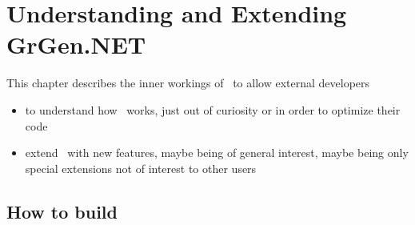 \chapter{Understanding and Extending GrGen.NET} \label{cha:developing}

This chapter describes the inner workings of \GrG~to allow external developers
\begin{itemize}
\item to understand how \GrG~works, just out of curiosity or in order to optimize their code
\item extend \GrG~with new features, maybe being of general interest, maybe being only special extensions not of interest to other users
\end{itemize}

\section{How to build}\label{sub:building}

